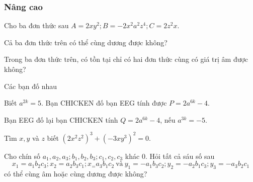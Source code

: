 \subsubsection{Nâng cao}
\begin{bt}%
	Cho ba đơn thức sau $A=2xy^2;B=-2x^2a^2z^4;C=2z^2x$.
	\begin{enumEX}{1}
		\item Cả ba đơn thức trên có thể cùng dương được không?
		\item Trong ba đơn thức trên, có tồn tại chỉ có hai đơn thức cùng có giá trị âm được không?
	\end{enumEX}	
\end{bt}

\begin{bt}%
	Các bạn đố nhau 
	\begin{enumEX}{1}
		\item Biết $a^{2k}=5$. Bạn CHICKEN đố bạn EEG tính được $P=2a^{6k}-4$.
		\item Bạn EEG đố lại bạn CHICKEN tính $Q=2a^{6k}-4$, nếu $a^{3k}=-5$.
	\end{enumEX}
\end{bt}

\begin{bt}%
	Tìm $x,y$ và $z$ biết $\left(2x^2z^2\right)^3+\left(-3xy^3\right)^2=0$.
\end{bt}

\begin{bt}%
	Cho chín số $a_1,a_2,a_3;b_1,b_2,b_3;c_1,c_2,c_3$ khác $0$. Hỏi tất cả sáu số sau $$x_1=a_1b_2c_3;x_2=a_2b_3c_1;x_=a_3b_1c_2\ \text{và}\ y_1=-a_1b_3c_2;y_2=-a_2b_1c_3;y_3=-a_3b_2c_1$$ có thể cùng âm hoặc cùng dương được không?
\end{bt}
